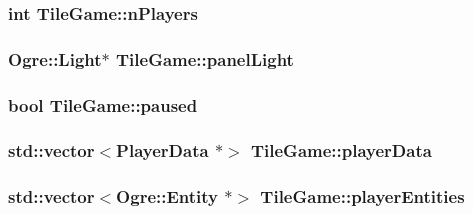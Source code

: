 \hypertarget{classTileGame_a232f92064d80b722b022a3845be35b9e}{
\subsubsection[{n\-Players}]{\setlength{\rightskip}{0pt plus 5cm}int Tile\-Game\-::n\-Players\hspace{0.3cm}{\ttfamily [protected]}}}\label{classTileGame_a232f92064d80b722b022a3845be35b9e}
\hypertarget{classTileGame_a23db72b0263e4d5595c1f170cc312185}{
\subsubsection[{panel\-Light}]{\setlength{\rightskip}{0pt plus 5cm}Ogre\-::\-Light$\ast$ Tile\-Game\-::panel\-Light\hspace{0.3cm}{\ttfamily [protected]}}}\label{classTileGame_a23db72b0263e4d5595c1f170cc312185}
\hypertarget{classTileGame_ac76eb85a5597f84146e49c92f7edc877}{
\subsubsection[{paused}]{\setlength{\rightskip}{0pt plus 5cm}bool Tile\-Game\-::paused\hspace{0.3cm}{\ttfamily [protected]}}}\label{classTileGame_ac76eb85a5597f84146e49c92f7edc877}
\hypertarget{classTileGame_adc02f822e33b2d8a77693301d050bb91}{
\subsubsection[{player\-Data}]{\setlength{\rightskip}{0pt plus 5cm}std\-::vector$<${\bf Player\-Data} $\ast$$>$ Tile\-Game\-::player\-Data\hspace{0.3cm}{\ttfamily [protected]}}}\label{classTileGame_adc02f822e33b2d8a77693301d050bb91}
\hypertarget{classTileGame_a30a9864bb733707d17c15b2c09a6245a}{
\subsubsection[{player\-Entities}]{\setlength{\rightskip}{0pt plus 5cm}std\-::vector$<$Ogre\-::\-Entity $\ast$$>$ Tile\-Game\-::player\-Entities\hspace{0.3cm}{\ttfamily [protected]}}}\label{classTileGame_a30a9864bb733707d17c15b2c09a6245a}
